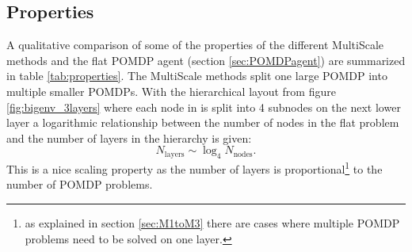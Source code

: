 \subsection{Properties}\label{subsec:MultiScale_properties}
A qualitative comparison of some of the properties of the different MultiScale methods and the flat POMDP agent (section \ref{sec:POMDPagent}) are summarized in table \ref{tab:properties}.  The MultiScale methods split one large POMDP into multiple smaller POMDPs. With the hierarchical layout from figure \ref{fig:bigenv_3layers} where each node in is split into 4 subnodes on the next lower layer a logarithmic relationship between the number of nodes in the flat problem and the number of layers in the hierarchy is given:
\begin{equation}
    N_\text{layers} \sim \log_4 N_\text{nodes}.
\end{equation}
This is a nice scaling property as the number of layers is proportional\footnote{as explained in section \ref{sec:M1toM3} there are cases where multiple POMDP problems need to be solved on one layer.} to the number of POMDP problems. \\

